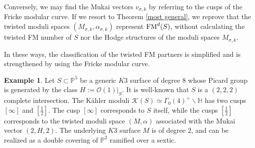 \documentclass{article}
\theoremstyle{plain}
\theoremstyle{definition}
\newtheorem{example}[theorem]{Example}%
\theoremstyle{remark}
\newcommand{\proj}{{\mathbb P}}
\begin{document}
Conversely, 
we may find the Mukai vectors $v_{\sigma , k}$ 
by referring to the cusps of the Fricke modular curve. 
If we resort to 
Theorem \ref{most general}, 
we reprove that the twisted moduli spaces $(M_{\sigma , k}, \alpha _{\sigma , k})$ 
represent ${\rm FM\/}^{d}(S)$, 
without calculating the twisted FM number of $S$ 
nor the Hodge structures of the moduli spaces $M_{\sigma , k}$.   


In these ways,  
the classification of the twisted FM partners is 
simplified and is strengthened by using the Fricke modular curve.  










\begin{example}
Let 
$S \subset {\proj}^{5}$ 
be a generic $K3$ surface of degree $8$ 
whose Picard group is generated by the class $H := \mathcal{O}(1)|_{S}$.    
It is well-known that $S$ is a $(2, 2, 2)$ complete intersection. 
The K\"ahler moduli 
$\mathcal{K} (S) \simeq\Gamma _{0}(4)^{+} \backslash {\mathbb H}$ 
has two cusps 
$[\infty]$ and $[\frac{1}{2}]$. 
The cusp $[\infty]$  corresponds to $S$ itself, 
while the cusps $[\frac{1}{2}]$ corresponds to 
the twisted moduli space $(M, \alpha )$ associated with the Mukai vector $(2, H, 2)$. 
The underlying $K3$ surface $M$ is of degree $2$, 
and can be realized as a double covering of  ${\proj}^{2}$ 
ramified over a sextic. 
\end{example}
\end{document}
